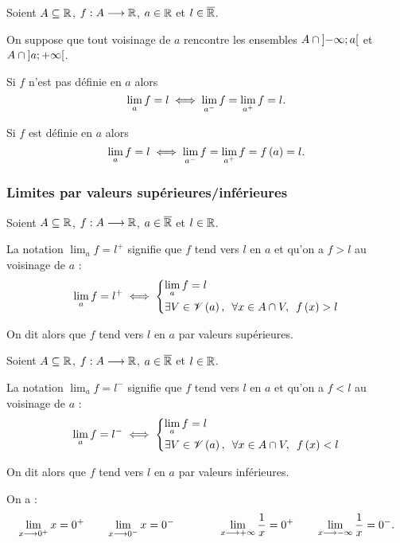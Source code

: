 \begin{prop}
Soient \(A\subseteq\mathbb{R}\), \(f:A\longrightarrow\mathbb{R}\), \(a\in\mathbb{R}\) et \(l\in\overline{\mathbb{R}}\).

On suppose que tout voisinage de \(a\) rencontre les ensembles \(A\cap\left]-\infty;a\right[\) et \(A\cap\left]a;+\infty\right[\).

Si \(f\) n'est pas définie en \(a\) alors \[\lim_af=l\iff\lim_{a^-}f=\lim_{a^+}f=l.\]

Si \(f\) est définie en \(a\) alors \[\lim_af=l\iff\lim_{a^-}f=\lim_{a^+}f=f\left(a\right)=l.\]
\end{prop}

\subsubsection{Limites par valeurs supérieures/inférieures}

\begin{nota}
Soient \(A\subseteq\mathbb{R}\), \(f:A\longrightarrow\mathbb{R}\), \(a\in\overline{\mathbb{R}}\) et \(l\in\mathbb{R}\).

La notation \(\lim_af=l^+\) signifie que \(f\) tend vers \(l\) en \(a\) et qu'on a \(f>l\) au voisinage de \(a\) : \[\lim_af=l^+\ssi\begin{dcases}\lim_af=l \\ \quantifs{\exists V\in\V{a};\forall x\in A\inter V}f\paren{x}>l\end{dcases}\]

On dit alors que \(f\) tend vers \(l\) en \(a\) par valeurs supérieures.
\end{nota}

\begin{nota}
Soient \(A\subseteq\mathbb{R}\), \(f:A\longrightarrow\mathbb{R}\), \(a\in\overline{\mathbb{R}}\) et \(l\in\mathbb{R}\).

La notation \(\lim_af=l^-\) signifie que \(f\) tend vers \(l\) en \(a\) et qu'on a \(f<l\) au voisinage de \(a\) : \[\lim_af=l^-\ssi\begin{dcases}\lim_af=l \\ \quantifs{\exists V\in\V{a};\forall x\in A\inter V}f\paren{x}<l\end{dcases}\]

On dit alors que \(f\) tend vers \(l\) en \(a\) par valeurs inférieures.
\end{nota}

\begin{ex}
On a : \[\lim_{x\longrightarrow0^+}x=0^+\qquad\lim_{x\longrightarrow0^-}x=0^-\qquad\qquad\lim_{x\longrightarrow+\infty}\dfrac{1}{x}=0^+\qquad\lim_{x\longrightarrow-\infty}\dfrac{1}{x}=0^-.\]
\end{ex}

